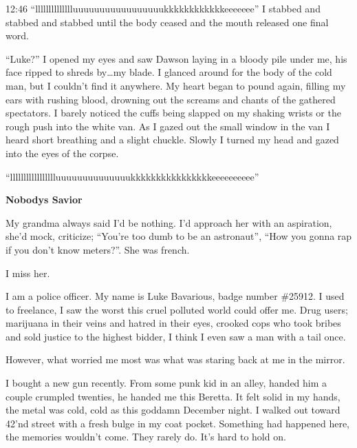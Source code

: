 12:46
``lllllllllllllluuuuuuuuuuuuuuuuukkkkkkkkkkkkeeeeeee'' I
stabbed and stabbed and stabbed until the body ceased and the mouth
released one final word.

``Luke?'' I opened my eyes and saw Dawson laying in a
bloody pile under me, his face ripped to shreds by{\ldots}my blade. I
glanced around for the body of the cold man, but I couldn't find it
anywhere. My heart began to pound again, filling my ears with
rushing blood, drowning out the screams and chants of the gathered
spectators. I barely noticed the cuffs being slapped on my shaking
wrists or the rough push into the white van. As I gazed out the
small window in the van I heard short breathing and a slight
chuckle. Slowly I turned my head and gazed into the eyes of the
corpse.

``llllllllllllllllluuuuuuuuuuuuuukkkkkkkkkkkkkkkkeeeeeeeeee''

 





{\bf Nobodys Savior}



My grandma always said I'd be nothing. I'd approach her with an
aspiration, she'd mock, criticize; ``You're too dumb to be an
astronaut'', ``How you gonna rap if you don't know meters?''. She was
french.



I miss her.



I am a police officer. My name is Luke Bavarious, badge number
\#25912. I used to freelance, I saw the worst this cruel polluted
world could offer me. Drug users; marijuana in their veins and
hatred in their eyes, crooked cops who took bribes and sold justice
to the highest bidder, I think I even saw a man with a tail
once.



However, what worried me most was what was staring back at me in
the mirror.



I bought a new gun recently. From some punk kid in an alley, handed
him a couple crumpled twenties, he handed me this Beretta. It felt
solid in my hands, the metal was cold, cold as this goddamn
December night. I walked out toward 42'nd street with a fresh bulge
in my coat pocket. Something had happened here, the memories
wouldn't come. They rarely do. It's hard to hold on.



